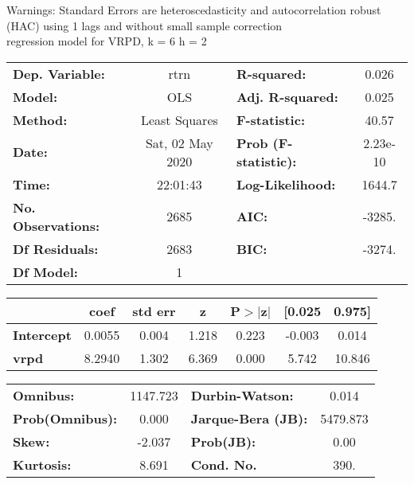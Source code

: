 Warnings: \newline
 [1] Standard Errors are heteroscedasticity and autocorrelation robust (HAC) using 1 lags and without small sample correction\\ 

regression model for VRPD, k = 6 h = 2\begin{center}
\begin{tabular}{lclc}
\toprule
\textbf{Dep. Variable:}    &       rtrn       & \textbf{  R-squared:         } &     0.026   \\
\textbf{Model:}            &       OLS        & \textbf{  Adj. R-squared:    } &     0.025   \\
\textbf{Method:}           &  Least Squares   & \textbf{  F-statistic:       } &     40.57   \\
\textbf{Date:}             & Sat, 02 May 2020 & \textbf{  Prob (F-statistic):} &  2.23e-10   \\
\textbf{Time:}             &     22:01:43     & \textbf{  Log-Likelihood:    } &    1644.7   \\
\textbf{No. Observations:} &        2685      & \textbf{  AIC:               } &    -3285.   \\
\textbf{Df Residuals:}     &        2683      & \textbf{  BIC:               } &    -3274.   \\
\textbf{Df Model:}         &           1      & \textbf{                     } &             \\
\bottomrule
\end{tabular}
\begin{tabular}{lcccccc}
                   & \textbf{coef} & \textbf{std err} & \textbf{z} & \textbf{P$> |$z$|$} & \textbf{[0.025} & \textbf{0.975]}  \\
\midrule
\textbf{Intercept} &       0.0055  &        0.004     &     1.218  &         0.223        &       -0.003    &        0.014     \\
\textbf{vrpd}      &       8.2940  &        1.302     &     6.369  &         0.000        &        5.742    &       10.846     \\
\bottomrule
\end{tabular}
\begin{tabular}{lclc}
\textbf{Omnibus:}       & 1147.723 & \textbf{  Durbin-Watson:     } &    0.014  \\
\textbf{Prob(Omnibus):} &   0.000  & \textbf{  Jarque-Bera (JB):  } & 5479.873  \\
\textbf{Skew:}          &  -2.037  & \textbf{  Prob(JB):          } &     0.00  \\
\textbf{Kurtosis:}      &   8.691  & \textbf{  Cond. No.          } &     390.  \\
\bottomrule
\end{tabular}
\end{center}

